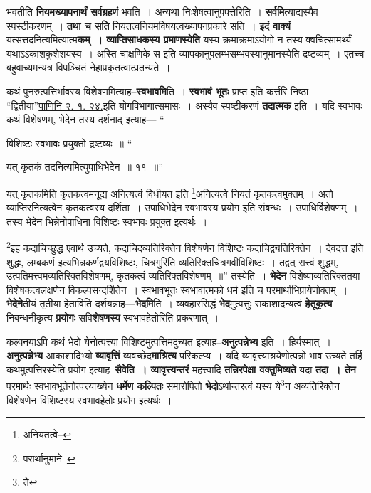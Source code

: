 \documentclass[article,12pt,a4paper]{memoir}
\begin{document}
	  \endgroup
	

	  \pstart भवतीति \textbf{नियमख्यापनार्थं सर्वग्रहणं} भवति । अन्यथा निःशेषत्वानुपपत्तेरिति । \textbf{सर्वमि}त्याद्यस्यैव स्पस्टीकरणम् । \textbf{तथा च सति} नियतत्वनियमविषयत्वख्यापनप्रकारे सति । \textbf{इदं वाक्यं} यत्सत्तदनित्यमित्यात्म\textbf{कम् । व्याप्तिसाधकस्य प्रमाणस्येति} यस्य क्रमाक्रमाऽयोगो न तस्य क्वचित्सामर्थ्यं यथाऽऽकाशकुशेशयस्य । अस्ति चाक्षणिके स इति व्यापकानुपलम्भसम्भवस्यानुमानस्येति द्रष्टव्यम् । एतच्च बहुवाच्यमन्यत्र विपञ्चितं नेहाप्रकृतत्वात्प्रतन्यते ।
	\pend
      

	  \pstart कथं पुनरुत्पत्तिर्भावस्य विशेषणमित्याह--\textbf{स्वभावमि}ति । \textbf{स्वभावं भूतः} प्राप्त इति कर्त्तरि निष्ठा “द्वितीया”\href{http://http://sarit.indology.info/?cref=Pā.2.1.24}{पाणिनि २. १. २४.}इति योगविभागा\leavevmode{}त्समासः । अस्यैव स्पष्टीकरणं \textbf{तदात्मक} इति । यदि स्वभावः कथं विशेषणम्, भेदेन तस्य दर्शनाद् इत्याह—  \leavevmode{} “
	  
	विशिष्टः स्वभावः प्रयुक्तो द्रष्टव्यः ॥ “
	  
	यत् कृतकं तदनित्यमित्युपाधिभेदेन ॥ ११ ॥” 
	  
	यत् कृतकमिति कृतकत्वमनूद्य अनित्यत्वं विधीयत इति \footnote{अनियतत्वे--\cite{dp-msA}}अनित्यत्वे नियतं कृतकत्वमुक्तम् । अतो व्याप्तिरनित्यत्वेन कृतकत्वस्य दर्शिता । उपाधिभेदेन स्वभावस्य प्रयोग इति संबन्धः । उपाधिर्विशेषणम् । तस्य भेदेन भिन्नेनोपाधिना विशिष्टः स्वभावः प्रयुक्त इत्यर्थः । 
	  
	\footnote{परार्थानुमाने--\cite{dp-msD-n}}इह कदाचिच्छुद्ध एवार्थ उच्यते, कदाचिदव्यतिरिक्तेन विशेषणेन विशिष्टः कदाचिद्व्यतिरिक्तेन । देवदत्त इति शुद्धः, लम्बकर्ण इत्यभिन्नकर्णद्वयविशिष्टः, चित्रगुरिति व्यतिरिक्तचित्रगवीविशिष्टः । तद्वत् सत्त्वं शुद्धम्, उत्पतिमत्त्वमव्यतिरिक्तविशेषणम्, कृतकत्वं व्यतिरिक्तविशेषणम् ॥” तस्येति । \textbf{भेदेन} विशेष्याव्यतिरिक्ततया विशेषकत्वलक्षणेन विकल्पसन्दर्शितेन । स्वभावभूतः स्वभावात्मको धर्म इति च परमार्थाभिप्रायेणोक्तम् । \textbf{भेदेने}तीयं तृतीया हेताविति दर्शयन्नाह—\textbf{भेदमि}ति । व्यवहारसिद्धं \textbf{भेद}मुत्पत्तुः सकाशादन्यत्वं \textbf{हेतूकृत्य} निबन्धनीकृत्य \textbf{प्रयोगः} सवि\textbf{शेषणस्य} स्वभावहेतोरिति प्रकरणात् ।
	\pend
      

	  \pstart कल्पनयाऽपि कथं भेदो येनोत्पत्त्या विशिष्टमुत्पत्तिमदुच्यत इत्याह--\textbf{अनुत्पन्नेभ्य} इति । हिर्यस्मात् । \textbf{अनुत्पन्नेभ्य} आकाशादिभ्यो \textbf{व्यावृत्तिं} व्यवच्छेद\textbf{माश्रित्य} परिकल्प्य । यदि व्यावृत्त्याश्रयेणोत्पन्नो भाव उच्यते तर्हि कथमुत्पत्तिरस्येति प्रयोग इत्याह--\textbf{सैवेति । व्यावृत्त्यन्तरं} महत्त्वादि \textbf{तन्निरपेक्षा वक्तुमिष्यते} यदा \textbf{तदा । तेन} परमार्थः स्वभावभूतेनोत्पत्त्याख्येन \textbf{धर्मेण कल्पितः} समारोपितो \textbf{भेदो}ऽर्थान्तरत्वं यस्य ये\footnote{ते}न अव्यतिरिक्तेन विशेषणेन विशिष्टस्य स्वभावहेतोः प्रयोग इत्यर्थः ।
	\pend
      
\end{document}
